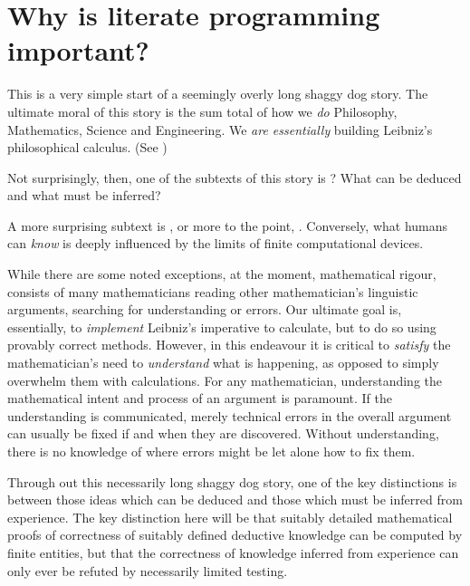 
\startchapter[title=Overview] 

\section{Why is literate programming important?}

This is a very simple start of a seemingly overly long shaggy dog story. 
The ultimate moral of this story is the sum total of how we \emph{do} 
Philosophy, Mathematics, Science and Engineering. We \emph{are 
essentially} building Leibniz's philosophical calculus. (See ) 

Not surprisingly, then, one of the subtexts of this story is ? What can be deduced and what must be inferred? 

A more surprising subtext is , or more 
to the point, . Conversely, what humans can 
\emph{know} is deeply influenced by the limits of finite computational 
devices. 

While there are some noted exceptions, at the moment, mathematical rigour, 
consists of many mathematicians reading other mathematician's linguistic 
arguments, searching for understanding or errors. Our ultimate goal is, 
essentially, to \emph{implement} Leibniz's imperative to calculate, but to 
do so using provably correct methods. However, in this endeavour it is 
critical to \emph{satisfy} the mathematician's need to \emph{understand} 
what is happening, as opposed to simply overwhelm them with 
 calculations. For any mathematician, understanding the 
mathematical intent and process of an argument is paramount. If the 
understanding is communicated, merely technical errors in the overall 
argument can usually be fixed if and when they are discovered. Without 
understanding, there is no knowledge of where errors might be let alone 
how to fix them. 

Through out this necessarily long shaggy dog story, one of the key 
distinctions is between those ideas which can be deduced and those which 
must be inferred from experience. The key distinction here will be that 
suitably detailed mathematical proofs of correctness of suitably defined 
deductive knowledge can be computed by finite entities, but that the 
correctness of knowledge inferred from experience can only ever be refuted 
by necessarily limited testing. 

